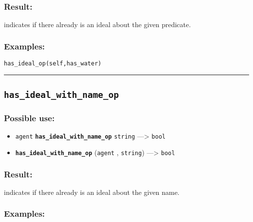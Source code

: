 \documentclass[]{book}
\providecommand{\tightlist}{%
  \setlength{\itemsep}{0pt}\setlength{\parskip}{0pt}}
\theoremstyle{definition}
\theoremstyle{definition}
\theoremstyle{definition}
\theoremstyle{remark}
\begin{document}
\subsubsection{Result:}\label{result-241}

indicates if there already is an ideal about the given predicate.

\subsubsection{Examples:}\label{examples-190}

\begin{verbatim}
has_ideal_op(self,has_water) 
\end{verbatim}

\begin{center}\rule{0.5\linewidth}{\linethickness}\end{center}

\subsection{\texorpdfstring{\texttt{has\_ideal\_with\_name\_op}}{has\_ideal\_with\_name\_op}}\label{has_ideal_with_name_op}

\subsubsection{Possible use:}\label{possible-use-251}

\begin{itemize}
\tightlist
\item
  \texttt{agent} \textbf{\texttt{has\_ideal\_with\_name\_op}}
  \texttt{string} ---\textgreater{} \texttt{bool}
\item
  \textbf{\texttt{has\_ideal\_with\_name\_op}} (\texttt{agent} ,
  \texttt{string}) ---\textgreater{} \texttt{bool}
\end{itemize}

\subsubsection{Result:}\label{result-242}

indicates if there already is an ideal about the given name.

\subsubsection{Examples:}\label{examples-191}
\end{document}
